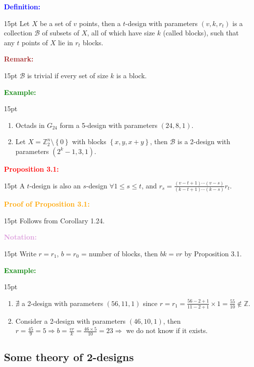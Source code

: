 \documentclass[12pt]{article}
\newcommand{\noparskip}{\vspace{-\parskip}}
\newenvironment{points}
	{\begin{enumerate}[label = (\arabic*)]}
	{\end{enumerate}}
\newenvironment{dent}
	{\begin{adjustwidth}{15pt}{}\noparskip}
	{\end{adjustwidth}}
\newenvironment{result}[1]
	{\textcolor{Red}{\textbf{#1:}}\begin{dent}}
	{\end{dent}}
\newenvironment{proof}[1]
	{\textcolor{Orange}{\textbf{Proof of #1:}}\begin{dent}}
	{\end{dent}}
\newenvironment{definition}
	{\textcolor{Blue}{\textbf{Definition:}}\begin{dent}}
	{\end{dent}}
\newenvironment{notation}
	{\textcolor{Plum}{\textbf{Notation:}}\begin{dent}}
	{\end{dent}}
\newenvironment{example}
	{\textcolor{Green}{\textbf{Example:}}\begin{dent}}
	{\end{dent}}
\newenvironment{remark}
	{\textcolor{Brown}{\textbf{Remark:}}\begin{dent}}
	{\end{dent}}
\renewcommand{\implies}{\Rightarrow}
\newcommand{\set}[1]{\left\{ #1 \right\}}
\newcommand{\Z}{\mathbb{Z}}
\newcommand{\cB}{\mathcal{B}}
\begin{document}
\begin{definition}
Let $X$ be a set of $v$ points, then a $t$-design with parameters $(v, k, r_t)$ is a collection $\cB$ of subsets of $X$, all of which have size $k$ (called blocks), such that any $t$ points of $X$ lie in $r_t$ blocks.
\end{definition}

\begin{remark}
$\cB$ is trivial if every set of size $k$ is a block.
\end{remark}

\begin{example}
\begin{points}
\item Octads in $G_{24}$ form a 5-design with parameters $(24, 8, 1)$.
\item Let $X = \Z_2^n \setminus \set{0}$ with blocks $\set{x, y, x + y}$, then $\cB$ is a 2-design with parameters $(2^k - 1, 3, 1)$.
\end{points}
\end{example}

\begin{result}{Proposition 3.1}
A $t$-design is also an $s$-design $\forall 1 \le s \le t$, and $r_s = \frac{(v - t + 1) \cdots (v - s)}{(k - t + 1) \cdots (k - s)} r_t$.
\end{result}

\begin{proof}{Proposition 3.1}
Follows from Corollary 1.24.
\end{proof}

\begin{notation}
Write $r = r_1$, $b = r_0$ = number of blocks, then $bk = vr$ by Proposition 3.1.
\end{notation}

\begin{example}
\begin{points}
\item $\nexists$ a 2-design with parameters $(56, 11, 1)$ since $r = r_1 = \frac{56 - 2 + 1}{11 - 2 + 1} \times 1 = \frac{55}{10} \notin \Z$.
\item Consider a 2-design with parameters $(46, 10, 1)$, then $r = \frac{45}{9} = 5 \implies b = \frac{vr}{k} = \frac{46 \times 5}{10} = 23 \implies$ we do not know if it exists.
\end{points}
\end{example}

\subsection{Some theory of 2-designs}
\end{document}
